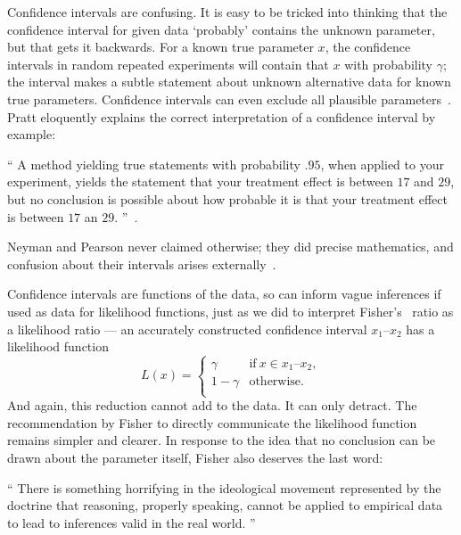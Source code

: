 Confidence intervals are confusing.
It is easy to be tricked into thinking that the confidence interval for given
data `probably' contains the unknown parameter, but that gets it backwards.
For a known true parameter $x$, the confidence intervals in random repeated
experiments will contain that $x$ with probability $\gamma$;
the interval makes a subtle statement about unknown alternative data for
known true parameters.
Confidence intervals can even exclude all plausible parameters~\cite{
pratt1961testing,
Jaynes1976intervals
}.
Pratt eloquently explains the correct interpretation of a confidence interval
by example:
\begin{displayquote}
\small
``%
A method yielding true statements with probability $.95$, when applied to your
experiment, yields the statement that your treatment effect is between $17$ and
$29$, but no conclusion is possible about how probable it is that your
treatment effect is between $17$ an $29$.%
''~\cite{pratt1961testing}.
\end{displayquote}
Neyman and Pearson never claimed otherwise; they did precise mathematics, and
confusion about their intervals arises externally~\cite{jaynes2003probability}.

Confidence intervals are functions of the data, so can inform vague inferences
if used as data for likelihood functions, just as we did to interpret Fisher's
\pvalue\ ratio as a likelihood ratio ---
an accurately constructed confidence interval $x_1\textrm{--}x_2$ has a
likelihood function
\begin{equation}
L(x) =
\left\{
\begin{matrix}
\gamma & \textrm{if}~x \in x_1\textrm{--}x_2, \\
1 - \gamma & \textrm{otherwise.} \\
\end{matrix}
\right.
\end{equation}
And again, this reduction cannot add to the data.
It can only detract.
The recommendation by Fisher to directly communicate the likelihood function
remains simpler and clearer.
In response to the idea that no conclusion can be drawn about the parameter
itself, Fisher also deserves the last word:
\begin{displayquote}
\small
``%
There is something horrifying in the ideological movement represented by the
doctrine that reasoning, properly speaking, cannot be applied to empirical data
to lead to inferences valid in the real world.%
''~\cite{fisher1956statistical}
\end{displayquote}


